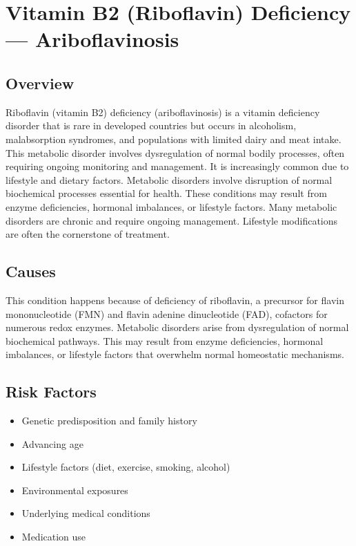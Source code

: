 \chapter{Vitamin B2 (Riboflavin) Deficiency --- Ariboflavinosis}
\label{sec:Vitamin B2 Deficiency}

\section{Overview}
Riboflavin (vitamin B2) deficiency (ariboflavinosis) is a vitamin deficiency disorder that is rare in developed countries but occurs in alcoholism, malabsorption syndromes, and populations with limited dairy and meat intake. This metabolic disorder involves dysregulation of normal bodily processes, often requiring ongoing monitoring and management. It is increasingly common due to lifestyle and dietary factors. Metabolic disorders involve disruption of normal biochemical processes essential for health. These conditions may result from enzyme deficiencies, hormonal imbalances, or lifestyle factors. Many metabolic disorders are chronic and require ongoing management. Lifestyle modifications are often the cornerstone of treatment.
\section{Causes}
This condition happens because of deficiency of riboflavin, a precursor for flavin mononucleotide (FMN) and flavin adenine dinucleotide (FAD), cofactors for numerous redox enzymes. Metabolic disorders arise from dysregulation of normal biochemical pathways. This may result from enzyme deficiencies, hormonal imbalances, or lifestyle factors that overwhelm normal homeostatic mechanisms.   
\section{Risk Factors}
\begin{itemize}[noitemsep]
  \item Genetic predisposition and family history
  \item Advancing age
  \item Lifestyle factors (diet, exercise, smoking, alcohol)
  \item Environmental exposures
  \item Underlying medical conditions
  \item Medication use
\end{itemize}
